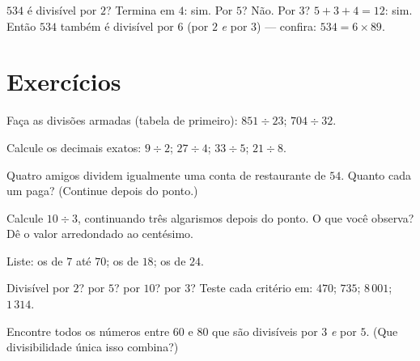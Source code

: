 \begin{example}\label{ex:g5:division:criteria}
$534$ é divisível por $2$? Termina em $4$: sim. Por $5$? Não. Por
$3$? $5 + 3 + 4 = 12$: sim. Então $534$ também é divisível por $6$
(por $2$ \emph{e} por $3$) --- confira: $534 = 6 \times 89$.
\end{example}

\section{Exercícios}

\begin{exercise}[$\star$]\label{exo:g5:division:1}
Faça as divisões armadas (tabela de  primeiro):
$851 \div 23$; \quad $704 \div 32$.
\end{exercise}

\begin{exercise}[$\star$]\label{exo:g5:division:2}
Calcule os  decimais exatos: $9 \div 2$; \quad
$27 \div 4$; \quad $33 \div 5$; \quad $21 \div 8$.
\end{exercise}

\begin{exercise}[$\star$]\label{exo:g5:division:3}
Quatro amigos dividem igualmente uma conta de restaurante de $54$.
Quanto cada um paga? (Continue depois do ponto.)
\end{exercise}

\begin{exercise}[$\star$]\label{exo:g5:division:4}
Calcule $10 \div 3$, continuando três algarismos depois do ponto. O
que você observa? Dê o valor arredondado ao centésimo.
\end{exercise}

\begin{exercise}[$\star$]\label{exo:g5:division:5}
Liste: os  de $7$ até $70$; os  de $18$; os
 de $24$.
\end{exercise}

\begin{exercise}[$\star$]\label{exo:g5:division:6}
Divisível por $2$? por $5$? por $10$? por $3$? Teste cada critério
em: $470$; \quad $735$; \quad $8\,001$; \quad $1\,314$.
\end{exercise}

\begin{exercise}[$\star$]\label{exo:g5:division:7}
Encontre todos os números entre $60$ e $80$ que são divisíveis por
$3$ \emph{e} por $5$. (Que divisibilidade única isso combina?)
\end{exercise}

